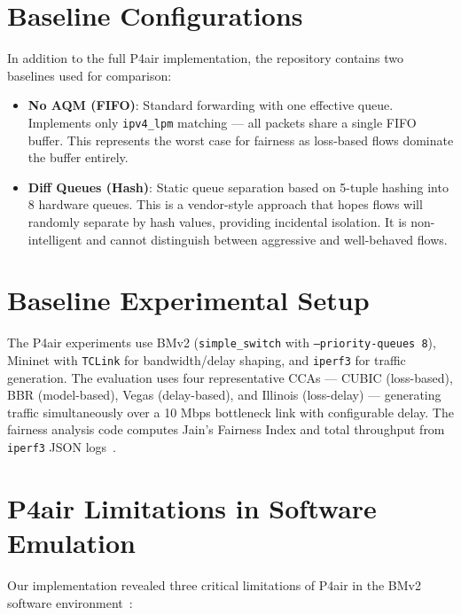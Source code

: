 \documentclass[12pt,a4paper]{report}
\begin{document}
\section{Baseline Configurations}
In addition to the full P4air implementation, the repository contains two baselines used for comparison:
\begin{itemize}
    \item \textbf{No AQM (FIFO)}: Standard forwarding with one effective queue. Implements only \texttt{ipv4\_lpm} matching — all packets share a single FIFO buffer. This represents the worst case for fairness as loss-based flows dominate the buffer entirely.
    \item \textbf{Diff Queues (Hash)}: Static queue separation based on 5-tuple hashing into 8 hardware queues. This is a vendor-style approach that hopes flows will randomly separate by hash values, providing incidental isolation. It is non-intelligent and cannot distinguish between aggressive and well-behaved flows.
\end{itemize}

\section{Baseline Experimental Setup}
The P4air experiments use BMv2 (\texttt{simple\_switch} with \texttt{--priority-queues 8}), Mininet with \texttt{TCLink} for bandwidth/delay shaping, and \texttt{iperf3} for traffic generation. The evaluation uses four representative CCAs — CUBIC (loss-based), BBR (model-based), Vegas (delay-based), and Illinois (loss-delay) — generating traffic simultaneously over a 10 Mbps bottleneck link with configurable delay. The fairness analysis code computes Jain's Fairness Index and total throughput from \texttt{iperf3} JSON logs~\cite{repo}.

\section{P4air Limitations in Software Emulation}
Our implementation revealed three critical limitations of P4air in the BMv2 software environment~\cite{repo}:
\end{document}
